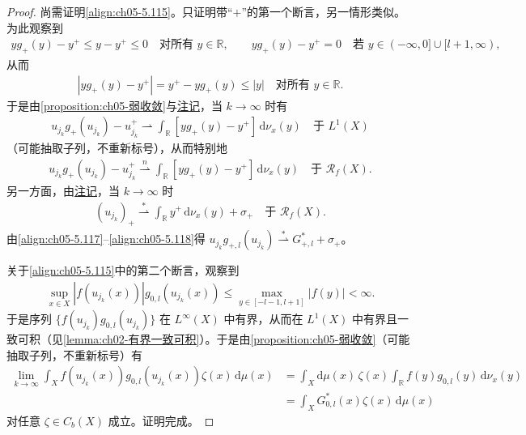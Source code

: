 \documentclass[../../main.tex]{subfiles}
\begin{document}
\begin{proof}
尚需证明\eqref{align:ch05-5.115}。只证明带“$+$”的第一个断言，另一情形类似。为此观察到
\begin{align*}
yg_+(y)-y^+\leqslant y-y^+\leqslant0\quad\text{对所有 }y\in\mathbb{R},
\qquad
yg_+(y)-y^+=0\quad\text{若 }y\in(-\infty,0]\cup[l+1,\infty),
\end{align*}
从而
\begin{align*}
|yg_+(y)-y^+|=y^+-yg_+(y)\leqslant|y|\quad\text{对所有 }y\in\mathbb{R}.
\end{align*}
于是由\cref{proposition:ch05-弱收敛}与\hyperref[remark:ch05-一致可积加强]{注记}，当 $k\to\infty$ 时有
\begin{align*}
u_{j_k}g_+(u_{j_k})-u^+_{j_k}\rightharpoonup\int_{\mathbb{R}}[yg_+(y)-y^+]\,\mathrm{d}\nu_x(y)
\quad\text{于 }L^1(X)
\end{align*}
（可能抽取子列，不重新标号），从而特别地
\begin{align}
u_{j_k}g_+(u_{j_k})-u^+_{j_k}\stackrel{n}{\rightharpoonup}\int_{\mathbb{R}}[yg_+(y)-y^+]\,\mathrm{d}\nu_x(y)
\quad\text{于 }\mathscr{R}_f(X).\label{align:ch05-5.117}
\end{align}
另一方面，由\hyperref[remark:ch05-5.4.4]{注记}，当 $k\to\infty$ 时
\begin{align}
(u_{j_k})_+\stackrel{*}{\rightharpoonup}\int_{\mathbb{R}}y^+\,\mathrm{d}\nu_x(y)+\sigma_+
\quad\text{于 }\mathscr{R}_f(X).\label{align:ch05-5.118}
\end{align}
由\eqref{align:ch05-5.117}--\eqref{align:ch05-5.118}得 $u_{j_k}g_{+,l}(u_{j_k})\stackrel{*}{\rightharpoonup}G^*_{+,l}+\sigma_+$。

关于\eqref{align:ch05-5.115}中的第二个断言，观察到
\begin{align*}
\sup_{x\in X}|f(u_{j_k}(x))|g_{0,l}(u_{j_k}(x))\leqslant\max_{y\in[-l-1,l+1]}|f(y)|<\infty.
\end{align*}
于是序列 $\{f(u_{j_k})g_{0,l}(u_{j_k})\}$ 在 $L^\infty(X)$ 中有界，从而在 $L^1(X)$ 中有界且一致可积（见\cref{lemma:ch02-有界一致可积}）。于是由\cref{proposition:ch05-弱收敛}（可能抽取子列，不重新标号）有
\begin{align*}
\lim_{k\to\infty}\int_Xf(u_{j_k}(x))g_{0,l}(u_{j_k}(x))\zeta(x)\,\mathrm{d}\mu(x)
&=\int_X\mathrm{d}\mu(x)\,\zeta(x)\int_{\mathbb{R}}f(y)g_{0,l}(y)\,\mathrm{d}\nu_x(y)\\
&=\int_XG^*_{0,l}(x)\zeta(x)\,\mathrm{d}\mu(x)
\end{align*}
对任意 $\zeta\in C_b(X)$ 成立。证明完成。
\end{proof}
\end{document}
